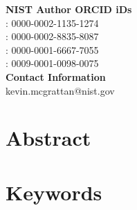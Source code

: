 \begin{titlepage}
\begin{flushleft}
{\textbf{NIST Author ORCID iDs}}\\
{\authorone:   0000-0002-1135-1274\\
 \authortwo:   0000-0002-8835-8087\\
 \authorthree: 0000-0001-6667-7055\\
 \authorfour:  0009-0001-0098-0075\\
}
\vfill
{\textbf{Contact Information}}\\
 {
kevin.mcgrattan@nist.gov
}
\vfill



\end{flushleft}
\end{titlepage}
\begin{titlepage}
\thispagestyle{fancy}
\renewcommand{\headrulewidth}{0pt}
  \fancyhead{}
  \fancyhead[l]{\small \pubnumber \\
	\small \pubmonth~\pubyear \\}
	\fancyfoot[c]{\thepage}
\section*{Abstract}
\pubabstract
\section*{Keywords}
\keywords
\newpage
\vspace*{-3cm}\small{\pubnumber \newline  \pubmonth~\pubyear}
\vspace{18pt}
\begin{center}
	\tableofcontents
	\appendixtitleon
    \appendixtitletocon
	\listoftables
	\listoffigures
\end{center}

\end{titlepage}
